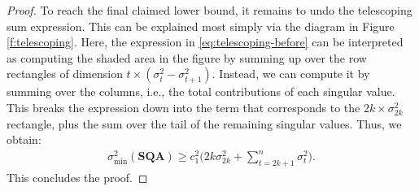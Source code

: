 \documentclass[11pt]{article}
\def\A{{\mathbf A}}
\def\Q{{\mathbf Q}}
\def\S{{\mathbf S}}
\begin{document}
\begin{proof}
To reach the final claimed lower bound, it remains to undo the telescoping sum expression. This can be explained most simply via the diagram in Figure \ref{f:telescoping}. Here, the expression in \eqref{eq:telescoping-before} can be interpreted as computing the shaded area in the figure by summing up over the row rectangles of dimension $t \times (\sigma_t^2-\sigma_{t+1}^2)$. Instead, we can compute it by summing over the columns, i.e., the total contributions of each singular value. This breaks the expression down into the term that corresponds to the $2k\times \sigma_{2k}^2$ rectangle, plus the sum over the tail of the remaining singular values. Thus, we obtain:
\begin{align}
\sigma_{\min}^2(\S \Q\A) \geq c_1^2 \Big(2k \sigma_{2k}^2 + \sum_{t = 2k + 1}^n \sigma_t^2 \Big).\label{eq:telescoping-after}
\end{align}
This concludes the proof.
\end{proof}
\end{document}
